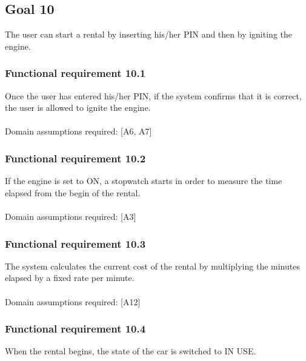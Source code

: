 \subsection{Goal 10}
The user can start a rental by inserting his/her PIN and then by igniting the engine.

\setcounter{secnumdepth}{3}
\subsubsection{Functional requirement 10.1}
Once the user has entered his/her PIN, if the system confirms that it is correct, the user is allowed to ignite the engine.\\~\\
\noindent Domain assumptions required: [A6, A7]

\subsubsection{Functional requirement 10.2}
If the engine is set to ON, a stopwatch starts in order to measure the time elapsed from the begin of the rental.\\~\\
\noindent Domain assumptions required: [A3]

\subsubsection{Functional requirement 10.3}
The system calculates the current cost of the rental by multiplying the minutes elapsed by a fixed rate per minute.\\~\\
\noindent Domain assumptions required: [A12]

\subsubsection{Functional requirement 10.4}
When the rental begins, the state of the car is switched to IN USE.
